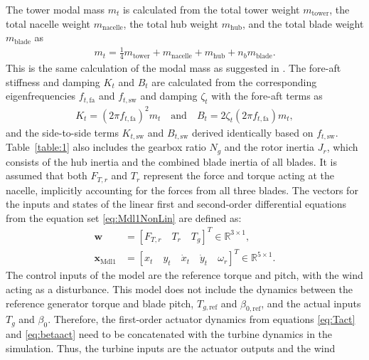 The tower modal mass \( m_t \) is calculated from the total tower weight \( m_{\text{tower}} \), the total nacelle weight \( m_{\text{nacelle}} \), the total hub weight \( m_{\text{hub}} \), and the total blade weight \( m_{\text{blade}} \) as  
\begin{align} \label{eq:modalMass}
    m_t = \frac{1}{4}m_{\text{tower}} + m_{\text{nacelle}} + m_{\text{hub}} + n_b m_{\text{blade}}.
\end{align} 
This is the same calculation of the modal mass as suggested in \cite{schlipf2013nonlinear}.
The fore-aft stiffness and damping $K_t$ and $B_t$ are calculated from the corresponding eigenfrequencies $f_{t,\text{fa}}$ and  $f_{t,\text{sw}}$ and damping $\zeta_t$  with the fore-aft terms as
\begin{align} \label{eq:DampingStiffness}
    K_t = (2\pi f_{t,\text{fa}})^2 m_t\quad\text{and}\quad B_t = 2 \zeta_t (2\pi f_{t,\text{fa}}) m_t,
\end{align}
and the side-to-side terms $K_{t,\text{sw}}$ and $B_{t,\text{sw}}$ derived identically based on $f_{t,\text{sw}}$.
Table~\ref{table:1} also includes the gearbox ratio $N_g$ and the rotor inertia $J_r$, which consists of the hub inertia and the combined blade inertia of all blades. It is assumed that both $F_{T,r}$ and $T_r$ represent the force and torque acting at the nacelle, implicitly accounting for the forces from all three blades. The vectors for the inputs and states of the linear first and second-order differential equations from the equation set \eqref{eq:Mdl1NonLin} are defined as:
\begin{equation}\label{eq:NonLinInputDef}
    \begin{split}
        \bm{w} &= [F_{T,r} \quad T_r \quad T_g ]^T  \in \mathbb{R}^{3 \times 1},\\
        \bm{x}_{\text{Mdl1}} &= [ x_{t} \quad y_{t} \quad \dot{x}_{t} \quad \dot{y}_{t} \quad \omega_r]^T \in \mathbb{R}^{5 \times 1}.
    \end{split}
\end{equation}
The control inputs of the model are the reference torque and pitch, with the wind acting as a disturbance. This model does not include the dynamics between the reference generator torque and blade pitch, $T_{g,\text{ref}}$ and $\beta_{0,\text{ref}}$, and the actual inputs $T_{g}$ and $\beta_{0}$. Therefore, the first-order actuator dynamics from equations \eqref{eq:Tact} and \eqref{eq:betaact} need to be concatenated with the turbine dynamics in the simulation. Thus, the turbine inputs are the actuator outputs and the wind 
